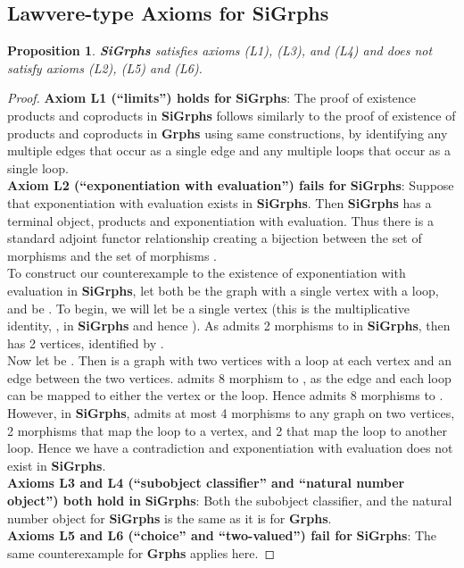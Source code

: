\documentclass[11pt]{article}
\newtheorem{proposition}[theorem]{Proposition}
\begin{document}
\subsection{Lawvere-type Axioms for \textbf{SiGrphs}}
\begin{proposition}
\textbf{SiGrphs} satisfies axioms (L1), (L3), and (L4) and does not satisfy axioms (L2), (L5) and (L6).
\end{proposition}
\begin{proof}
\textbf{Axiom L1 (``limits'') holds for} \textbf{SiGrphs}: The proof of existence products and coproducts in \textbf{SiGrphs} follows similarly to the proof of existence of products and coproducts in \textbf{Grphs} using same constructions, by identifying any multiple edges that occur as a single edge and any multiple loops that occur as a single loop.\\
\indent \textbf{Axiom L2 (``exponentiation with evaluation'') fails for} \textbf{SiGrphs}: Suppose that exponentiation with evaluation exists in \textbf{SiGrphs}. Then \textbf{SiGrphs} has a terminal object, products and exponentiation with evaluation. Thus there is a standard adjoint functor relationship creating a bijection between the set of morphisms  and the set of morphisms .\\
\indent To construct our counterexample to the existence of exponentiation with evaluation in \textbf{SiGrphs}, let both  be  the graph with a single vertex with a loop, and  be . To begin, we will let  be a single vertex (this is the multiplicative identity, , in \textbf{SiGrphs} and hence ). As  admits 2 morphisms to  in \textbf{SiGrphs}, then  has 2 vertices, identified by .\\
\indent Now let  be . Then  is a graph with two vertices with a loop at each vertex and an edge between the two vertices.  admits 8 morphism to , as the edge and each loop can be mapped to either the vertex or the loop. Hence  admits 8 morphisms to . However, in \textbf{SiGrphs},  admits at most 4 morphisms to any graph on two vertices, 2 morphisms that map the loop to a vertex, and 2 that map the loop to another loop. Hence we have a contradiction and exponentiation with evaluation does not exist in \textbf{SiGrphs}.\\
\indent \textbf{Axioms L3 and L4 (``subobject classifier'' and ``natural number object'') both hold in} \textbf{SiGrphs}: Both the subobject classifier, and the natural number object for \textbf{SiGrphs} is the same as it is for \textbf{Grphs}.\\
\indent \textbf{Axioms L5 and L6 (``choice'' and ``two-valued'') fail for} \textbf{SiGrphs}: The same counterexample for \textbf{Grphs} applies here.
\end{proof}
\end{document}
